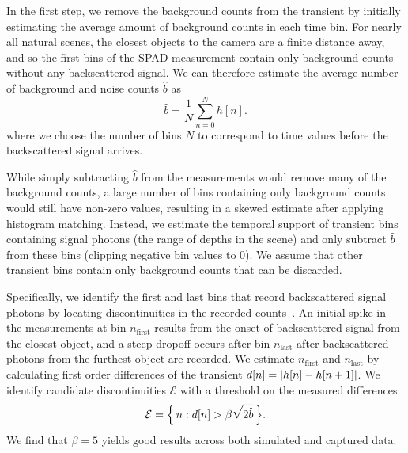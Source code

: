 \vspace{0.8em}
In the first step, we remove the background counts from the
transient by initially estimating the average amount of background counts
in each time bin. For nearly all natural scenes, the closest objects to the
camera are a finite distance away, and so the first bins of the SPAD
measurement contain only background counts without any backscattered
signal. We can therefore estimate the
average number of background and noise counts $\hat{b}$ as 
%
\begin{equation}
  \hat b = \frac{1}{N}\sum_{n=0}^N h[n]. 
  \label{eq:ambient_estimate}
\end{equation}
%
where we choose the number of bins $N$ to correspond to time
values before the backscattered signal arrives. 

While simply subtracting $\hat{b}$ from the measurements would remove many of
the background counts, a large number of bins containing only background counts would still
have non-zero values, resulting in a skewed
estimate after applying histogram matching.  Instead, we estimate the temporal
support of transient bins containing signal photons (\ie the range of depths in the
scene) and only subtract $\hat{b}$ from these bins (clipping negative bin values
to 0). We assume that other
transient bins contain only background counts that can be discarded. 

Specifically, we identify the first and last bins that record backscattered signal
photons by locating discontinuities in the recorded counts~\cite{Xin2019}. An initial spike in
the measurements at bin $n_\text{first}$ results from the onset of backscattered
signal from the closest object, and a steep dropoff occurs after bin
$n_\text{last}$ after backscattered photons from the
furthest object are recorded. 
We estimate $n_\text{first}$ and $n_\text{last}$ by calculating  
first order differences of the transient $d[n] = \lvert h[n] - h[n+1]\rvert$. 
 We identify candidate discontinuities
$\mathcal{E}$ with a threshold on the measured differences:
%
\begin{equation}
  \mathcal{E} = \mset{n}{d[n] > \beta\sqrt{2\hat b}}.
  \label{eq:edge_set}
\end{equation}
We find that $\beta = 5$ yields good results across both simulated and captured
data.

